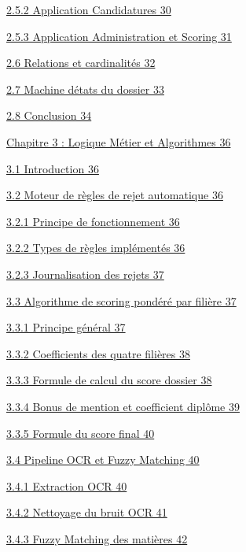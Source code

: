 \documentclass[
]{article}
\begin{document}
\protect\hyperlink{application-candidatures}{2.5.2 Application
Candidatures 30}

\protect\hyperlink{application-administration-et-scoring}{2.5.3
Application Administration et Scoring 31}

\protect\hyperlink{relations-et-cardinalituxe9s}{2.6 Relations et
cardinalités 32}

\protect\hyperlink{machine-duxe9tats-du-dossier}{2.7 Machine
d\textquotesingle états du dossier 33}

\protect\hyperlink{conclusion-1}{2.8 Conclusion 34}

\protect\hyperlink{chapitre-3-logique-muxe9tier-et-algorithmes}{Chapitre
3 : Logique Métier et Algorithmes 36}

\protect\hyperlink{introduction-2}{3.1 Introduction 36}

\protect\hyperlink{moteur-de-ruxe8gles-de-rejet-automatique}{3.2 Moteur
de règles de rejet automatique 36}

\protect\hyperlink{principe-de-fonctionnement}{3.2.1 Principe de
fonctionnement 36}

\protect\hyperlink{types-de-ruxe8gles-impluxe9mentuxe9s}{3.2.2 Types de
règles implémentés 36}

\protect\hyperlink{journalisation-des-rejets}{3.2.3 Journalisation des
rejets 37}

\protect\hyperlink{algorithme-de-scoring-ponduxe9ruxe9-par-filiuxe8re}{3.3
Algorithme de scoring pondéré par filière 37}

\protect\hyperlink{principe-guxe9nuxe9ral}{3.3.1 Principe général 37}

\protect\hyperlink{coefficients-des-quatre-filiuxe8res}{3.3.2
Coefficients des quatre filières 38}

\protect\hyperlink{formule-de-calcul-du-score-dossier}{3.3.3 Formule de
calcul du score dossier 38}

\protect\hyperlink{bonus-de-mention-et-coefficient-dipluxf4me}{3.3.4
Bonus de mention et coefficient diplôme 39}

\protect\hyperlink{formule-du-score-final}{3.3.5 Formule du score final
40}

\protect\hyperlink{pipeline-ocr-et-fuzzy-matching}{3.4 Pipeline OCR et
Fuzzy Matching 40}

\protect\hyperlink{extraction-ocr}{3.4.1 Extraction OCR 40}

\protect\hyperlink{nettoyage-du-bruit-ocr}{3.4.2 Nettoyage du bruit OCR
41}

\protect\hyperlink{fuzzy-matching-des-matiuxe8res}{3.4.3 Fuzzy Matching
des matières 42}
\end{document}
